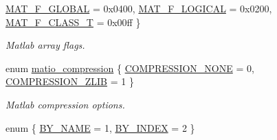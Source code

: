 \begin{DoxyCompactItemize}
\hyperlink{group__MAT_ggab9d6ef9e3ddca78a317b173f01d53fbba49084e0c796aa7963e53f7539525d40d}{\-M\-A\-T\-\_\-\-F\-\_\-\-G\-L\-O\-B\-A\-L} =  0x0400, 
\hyperlink{group__MAT_ggab9d6ef9e3ddca78a317b173f01d53fbba57eb5c6e200bcbc0f1b7982f29a169c2}{\-M\-A\-T\-\_\-\-F\-\_\-\-L\-O\-G\-I\-C\-A\-L} =  0x0200, 
\hyperlink{group__MAT_ggab9d6ef9e3ddca78a317b173f01d53fbba3a88beaec448e0485ffe21b18a540c1d}{\-M\-A\-T\-\_\-\-F\-\_\-\-C\-L\-A\-S\-S\-\_\-\-T} =  0x00ff
 \}
\begin{DoxyCompactList}\small\item\em \-Matlab array flags. \end{DoxyCompactList}\item 
enum \hyperlink{group__MAT_ga768c318af97bd2567758ecb001ceb7f4}{matio\-\_\-compression} \{ \hyperlink{group__MAT_gga768c318af97bd2567758ecb001ceb7f4ac549b871996d1ef05d40056bf5bb52e5}{\-C\-O\-M\-P\-R\-E\-S\-S\-I\-O\-N\-\_\-\-N\-O\-N\-E} =  0, 
\hyperlink{group__MAT_gga768c318af97bd2567758ecb001ceb7f4a1f453c9a2c01b52294b37a1226837f86}{\-C\-O\-M\-P\-R\-E\-S\-S\-I\-O\-N\-\_\-\-Z\-L\-I\-B} =  1
 \}
\begin{DoxyCompactList}\small\item\em \-Matlab compression options. \end{DoxyCompactList}\item 
enum \{ \hyperlink{group__MAT_gga06fc87d81c62e9abb8790b6e5713c55ba8938378c70879fe916177141cce0417e}{\-B\-Y\-\_\-\-N\-A\-M\-E} =  1, 
\hyperlink{group__MAT_gga06fc87d81c62e9abb8790b6e5713c55ba5f4d5606de1ec27f80f4a50186909005}{\-B\-Y\-\_\-\-I\-N\-D\-E\-X} =  2
 \}
\end{DoxyCompactItemize}
